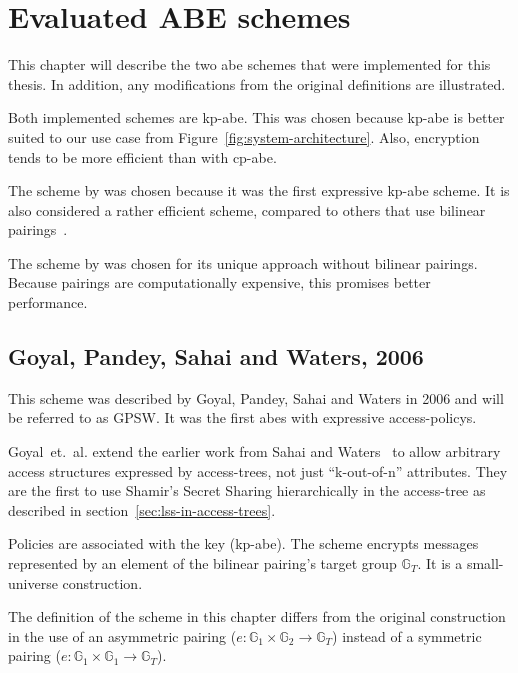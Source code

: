 \chapter{Evaluated ABE schemes}\label{chapter:constructions} 

This chapter will describe the two \acrlong{abe} schemes that were implemented for this thesis.
In addition, any modifications from the original definitions are illustrated.

Both implemented schemes are \acrshort{kp-abe}.
This was chosen because \acrshort{kp-abe} is better suited to our use case from Figure~\ref{fig:system-architecture}.
Also, encryption tends to be more efficient than with \acrshort{cp-abe}.

The scheme by \citeauthor{goyal_attribute-based_2006} was chosen because it was the first expressive \acrshort{kp-abe} scheme.
It is also considered a rather efficient scheme, compared to others that use bilinear pairings~\cite{girgenti_feasibility_2019}.

The scheme by \citeauthor{yao_lightweight_2015} was chosen for its unique approach without bilinear pairings. Because pairings are computationally expensive, this promises better performance.

\section{Goyal, Pandey, Sahai and Waters, 2006}
This scheme was described by Goyal, Pandey, Sahai and Waters \cite{goyal_attribute-based_2006} in 2006 and will be referred to as GPSW.
It was the first \acrshort{abes} with expressive \glspl{access-policy}.

Goyal~et.~al. extend the earlier work from Sahai and Waters~\cite{sahai_fuzzy_2005} to allow arbitrary access structures expressed by \glspl{access-tree}, not just ``k-out-of-n'' attributes.
They are the first to use Shamir's Secret Sharing hierarchically in the \gls{access-tree} as described in section~\ref{sec:lss-in-access-trees}. 

Policies are associated with the key (\acrshort{kp-abe}).
The scheme encrypts messages represented by an element of the bilinear pairing's target group $\mathbb{G}_T$.
It is a \gls{small-universe} construction.

The definition of the scheme in this chapter differs from the original construction in the use of an asymmetric pairing ($e: \mathbb{G}_1 \times \mathbb{G}_2 \rightarrow \mathbb{G}_T$) instead of a symmetric pairing ($e: \mathbb{G}_1 \times \mathbb{G}_1 \rightarrow \mathbb{G}_T$).

